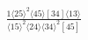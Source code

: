 \documentclass[varwidth, border=5pt]{standalone}
\begin{document}
\begin{my}
$\begin{gathered}
\scriptscriptstyle\frac{1⟨25⟩^2⟨45⟩[34]⟨13⟩}{⟨15⟩^2⟨24⟩⟨34⟩^2[45]}
\end{gathered}$
\end{my}
\end{document}
